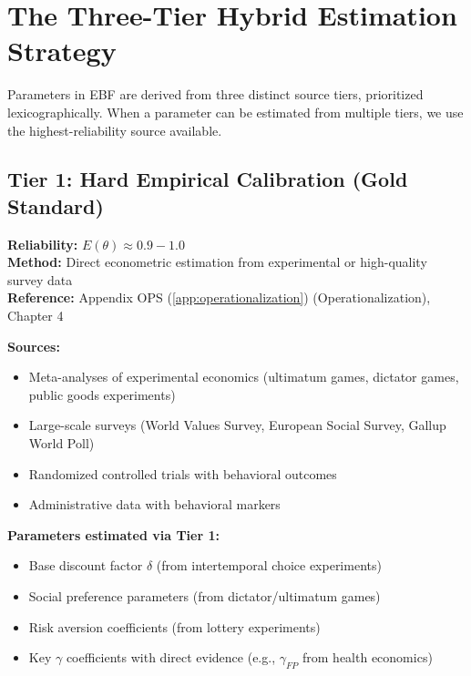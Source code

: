 \documentclass[11pt,a4paper]{article}
\theoremstyle{definition}
\begin{document}

\section{The Three-Tier Hybrid Estimation Strategy}
\label{sec:bbb-three-tier}

Parameters in EBF are derived from three distinct source tiers, 
prioritized lexicographically. When a parameter can be estimated from 
multiple tiers, we use the highest-reliability source available.

\subsection{Tier 1: Hard Empirical Calibration (Gold Standard)}

\begin{tcolorbox}[colback=green!5!white, colframe=green!75!black]
\textbf{Reliability:} $E(\theta) \approx 0.9 - 1.0$ \\
\textbf{Method:} Direct econometric estimation from experimental or high-quality survey data \\
\textbf{Reference:} Appendix OPS (\ref{app:operationalization}) (Operationalization), Chapter 4
\end{tcolorbox}

\textbf{Sources:}
\begin{itemize}
    \item Meta-analyses of experimental economics (ultimatum games, dictator games, 
    public goods experiments)
    \item Large-scale surveys (World Values Survey, European Social Survey, 
    Gallup World Poll)
    \item Randomized controlled trials with behavioral outcomes
    \item Administrative data with behavioral markers
\end{itemize}

\textbf{Parameters estimated via Tier 1:}
\begin{itemize}
    \item Base discount factor $\delta$ (from intertemporal choice experiments)
    \item Social preference parameters (from dictator/ultimatum games)
    \item Risk aversion coefficients (from lottery experiments)
    \item Key $\gamma$ coefficients with direct evidence (e.g., $\gamma_{FP}$ from 
    health economics)
\end{itemize}
\end{document}
